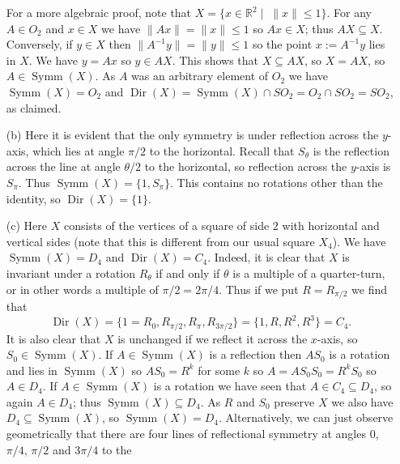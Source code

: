 \documentclass{amsart}
\DeclareMathOperator{\Dir}{Dir}
\DeclareMathOperator{\Symm}{Symm}
\renewcommand{\:}{\colon}
\newcommand{\sse}{\subseteq}
\newcommand{\st}{\;|\;}
\newcommand{\R}{\mathbb{R}}
\newcommand{\tht}       {\theta}
\theoremstyle{definition}
\newenvironment{solution}{{\noindent\bf Solution:}}{}
\begin{document}
\begin{solution}
\begin{itemize}
  For a more algebraic proof, note that $X=\{x\in\R^2\st\;\|x\|\leq
  1\}$.  For any $A\in O_2$ and $x\in X$ we have $\|Ax\|=\|x\|\leq 1$
  so $Ax\in X$; thus $AX\sse X$.  Conversely, if $y\in X$ then
  $\|A^{-1}y\|=\|y\|\leq 1$ so the point $x:=A^{-1}y$ lies in $X$.  We
  have $y=Ax$ so $y\in AX$.  This shows that $X\sse AX$, so $X=AX$, so
  $A\in\Symm(X)$.  As $A$ was an arbitrary element of $O_2$ we have
  $\Symm(X)=O_2$ and $\Dir(X)=\Symm(X)\cap SO_2=O_2\cap SO_2=SO_2$, as
  claimed.
 \item[(b)] Here it is evident that the only symmetry is under
  reflection across the $y$-axis, which lies at angle $\pi/2$ to the
  horizontal.  Recall that $S_\tht$ is the reflection across the line
  at angle $\tht/2$ to the horizontal, so reflection across the
  $y$-axis is $S_\pi$.  Thus $\Symm(X)=\{1,S_\pi\}$.  This contains no
  rotations other than the identity, so $\Dir(X)=\{1\}$.
  \begin{center}
  \end{center}
 \item[(c)] Here $X$ consists of the vertices of a square of side $2$
  with horizontal and vertical sides (note that this is different from
  our usual square $X_4$).  We have $\Symm(X)=D_4$ and $\Dir(X)=C_4$.
  Indeed, it is clear that $X$ is invariant under a rotation $R_\tht$
  if and only if $\tht$ is a multiple of a quarter-turn, or in other
  words a multiple of $\pi/2=2\pi/4$.  Thus if we put $R=R_{\pi/2}$ we
  find that
  \[ \Dir(X)=\{1=R_0,R_{\pi/2},R_\pi,R_{3\pi/2}\}=
      \{1,R,R^2,R^3\}=C_4.
  \]
  It is also clear that $X$ is unchanged if we reflect it across the
  $x$-axis, so $S_0\in\Symm(X)$.  If $A\in\Symm(X)$ is a reflection
  then $AS_0$ is a rotation and lies in $\Symm(X)$ so $AS_0=R^k$ for
  some $k$ so $A=AS_0S_0=R^kS_0$ so $A\in D_4$.  If $A\in\Symm(X)$ is
  a rotation we have seen that $A\in C_4\sse D_4$, so again $A\in D_4$; 
  thus $\Symm(X)\sse D_4$.  As $R$ and $S_0$ preserve $X$ we also have
  $D_4\sse\Symm(X)$, so $\Symm(X)=D_4$.  Alternatively, we can just
  observe geometrically that there are four lines of reflectional
  symmetry at angles $0$, $\pi/4$, $\pi/2$ and $3\pi/4$ to the

\end{itemize}
\end{solution}
\end{document}
